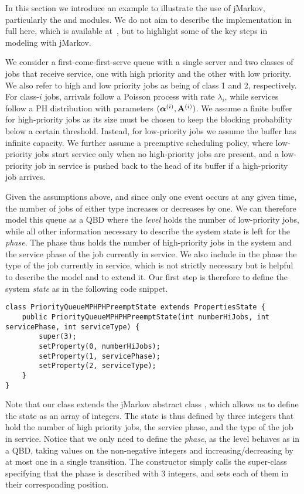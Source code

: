 In this section we introduce an example to illustrate the use of jMarkov,
particularly the  and  modules. We do not aim to
describe the implementation in full here, which is available
at~\cite{jMarkovWeb}, but to highlight some of the key steps in modeling with
jMarkov. 

We consider a first-come-first-serve queue with a single server and
two classes of jobs that receive service, one with high priority and the other
with low priority. We also refer to high and low priority jobs as being of
class 1 and 2, respectively. For class-$i$ jobs, arrivals follow a Poisson
process with rate $\lambda_i$, while services follow a PH distribution with
parameters $(\balpha^{(i)}, \bA^{(i)})$. We assume a finite buffer for
high-priority jobs as its size must be chosen to keep the blocking probability
below a certain threshold. Instead, for low-priority jobs we assume the buffer
has infinite capacity. We further assume a preemptive scheduling policy, where
low-priority jobs start service only when no high-priority jobs are present,
and a low-priority job in service is pushed back to the head of its buffer if a
high-priority job arrives.


Given the assumptions above, and since only one event occurs at any given time,
the number of jobs of either type increases or decreases by one. We can
therefore model this queue as a QBD where the \emph{level} holds the number of
low-priority jobs, while all other information necessary to describe the system
state is left for the \emph{phase}. The phase thus holds the number of
high-priority jobs in the system and the service phase of the job currently in
service. 
We also include in the phase the type of the job currently in service, which is
not strictly necessary but is helpful to describe the model and to extend it.
Our first step is therefore to define the system \emph{state} as in the
following code snippet.
\begin{lstlisting}
class PriorityQueueMPHPHPreemptState extends PropertiesState {
	public PriorityQueueMPHPHPreemptState(int numberHiJobs, int servicePhase, int serviceType) {
		super(3);
		setProperty(0, numberHiJobs);
		setProperty(1, servicePhase);
		setProperty(2, serviceType);
	}
}
\end{lstlisting}
Note that our class  extends the
jMarkov abstract class , which allows us to define the
state as an array of integers. The state is thus defined by three integers that hold the number of high priority jobs, the service phase, and the type of the job 
in service. Notice that we only need to define the \emph{phase}, as the level 
behaves as in a QBD, taking values on the non-negative integers and
increasing/decreasing by at most one in a single transition. 
The constructor simply calls the super-class
specifying that the phase is described with 3 integers, and sets each of them
in their corresponding position.


